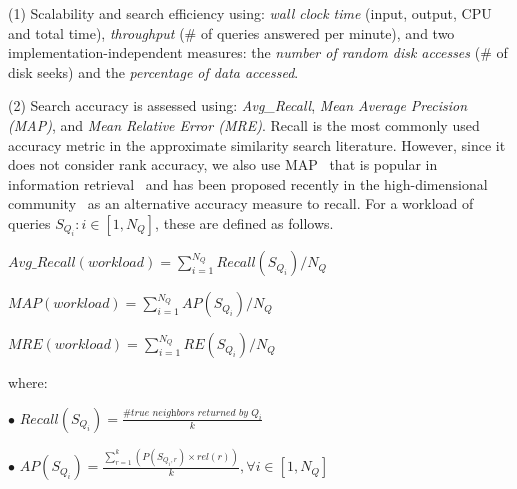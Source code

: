 {\noindent(1) Scalability and search efficiency using: \emph{wall clock time} (input, output, CPU  and total time), \emph{throughput} (\# of queries answered per minute), and two implementation-independent measures: the \emph{number of random disk accesses} (\# of disk seeks) and the \emph{percentage of data accessed}. 

\noindent(2) Search accuracy is assessed using: \emph{Avg\_Recall}, \emph{Mean Average Precision (MAP)}, and \emph{Mean Relative Error (MRE)}. Recall is the most commonly used accuracy metric in the approximate similarity search literature. However, since it does not consider rank accuracy, we also use MAP~\cite{conf/sigir/turpin2006} that is popular in information retrieval~\cite{book/manning2008,conf/sigir/buckley2000} {\color{black} and has been proposed recently in the high-dimensional community~\cite{hdindex} as an alternative accuracy measure to recall}. 
For a workload of queries $S_{Q_i} : i \in [1, N_Q]$, these are defined as follows.
\begin{compactitem}
\item $Avg\_Recall(workload) = \sum_{i=1}^{N_Q} Recall(S_{Q_i}) / N_Q $ 
{\color{black}\item $MAP(workload) = \sum_{i=1}^{N_Q} AP(S_{Q_i}) / N_Q $}
\item $MRE(workload) = \sum_{i=1}^{N_Q} RE(S_{Q_i}) / N_Q $
\end{compactitem}
where:  

\noindent$\bullet$  
$Recall(S_{Q_i}) = \frac{\textit{\# true neighbors returned by }{Q_i}}{k}$

\noindent$\bullet$  
$AP(S_{Q_i}) = \frac {\sum_{r=1}^{k} (P(S_{Q_i,r}) \times rel(r))} {k}, \forall i \in [1,N_Q]$ 

}
